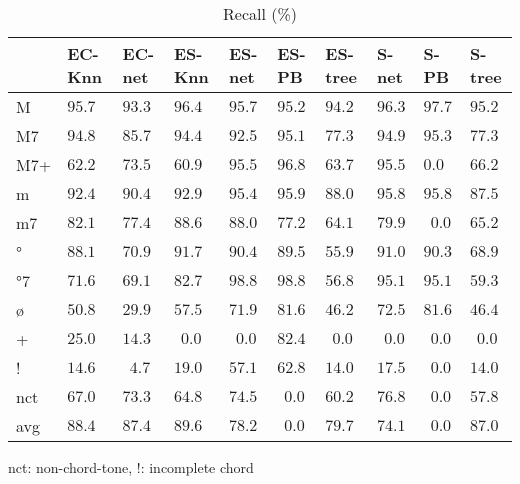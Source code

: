 \documentclass{article}
\begin{document}
\begin{table}
  \centering
  \begin{tabular}{l|p{.5cm}p{.5cm}p{.5cm}p{.5cm}p{.5cm}p{.5cm}p{.5cm}p{.5cm}p{.5cm}}

   & EC-Knn&EC-net&ES-Knn&ES-net&ES-PB &ES-tree&S-net &S-PB  &S-tree \\
\hline                                                
M  &$ 95.7  $&$ 93.3 $&$ 96.4 $&$95.7  $&$ 95.2 $&$ 94.2  $&$96.3  $&$ 97.7 $&$  95.2$ \\
M7 &$ 94.8  $&$ 85.7 $&$ 94.4 $&$92.5  $&$ 95.1 $&$ 77.3  $&$94.9  $&$ 95.3 $&$  77.3$ \\
M7+&$ 62.2  $&$ 73.5 $&$ 60.9 $&$95.5  $&$ 96.8 $&$ 63.7  $&$95.5  $&$  0.0 $&$  66.2$ \\
m  &$ 92.4  $&$ 90.4 $&$ 92.9 $&$95.4  $&$ 95.9 $&$ 88.0  $&$95.8  $&$ 95.8 $&$  87.5$ \\
m7 &$ 82.1  $&$ 77.4 $&$ 88.6 $&$88.0  $&$ 77.2 $&$ 64.1  $&$79.9  $&$~~0.0 $&$  65.2$ \\
°  &$ 88.1  $&$ 70.9 $&$ 91.7 $&$90.4  $&$ 89.5 $&$ 55.9  $&$91.0  $&$ 90.3 $&$  68.9$ \\
°7 &$ 71.6  $&$ 69.1 $&$ 82.7 $&$98.8  $&$ 98.8 $&$ 56.8  $&$95.1  $&$ 95.1 $&$  59.3$ \\
ø  &$ 50.8  $&$ 29.9 $&$ 57.5 $&$71.9  $&$ 81.6 $&$ 46.2  $&$72.5  $&$ 81.6 $&$  46.4$ \\
+  &$ 25.0  $&$ 14.3 $&$~~0.0 $&$~~0.0 $&$ 82.4 $&$~~0.0  $&$~~0.0 $&$~~0.0 $&$ ~~0.0$ \\
!  &$ 14.6  $&$~~4.7 $&$ 19.0 $&$57.1  $&$ 62.8 $&$ 14.0  $&$17.5  $&$~~0.0 $&$  14.0$ \\
nct&$ 67.0  $&$ 73.3 $&$ 64.8 $&$74.5  $&$~~0.0 $&$ 60.2  $&$76.8  $&$~~0.0 $&$  57.8$ \\
avg&$ 88.4  $&$ 87.4 $&$ 89.6 $&$78.2  $&$~~0.0 $&$ 79.7  $&$74.1  $&$~~0.0 $&$  87.0$ \\
  \end{tabular}                                                        

\medskip

nct: non-chord-tone, !: incomplete chord
  \caption{Recall (\%)}
  \label{tab:recall}
\end{table}
\end{document}
